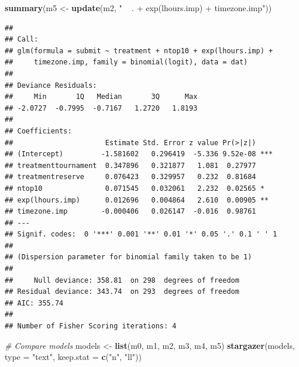 \documentclass[]{article}
\newenvironment{Shaded}{\begin{snugshade}}{\end{snugshade}}
\newcommand{\KeywordTok}[1]{\textcolor[rgb]{0.13,0.29,0.53}{\textbf{#1}}}
\newcommand{\DataTypeTok}[1]{\textcolor[rgb]{0.13,0.29,0.53}{#1}}
\newcommand{\StringTok}[1]{\textcolor[rgb]{0.31,0.60,0.02}{#1}}
\newcommand{\CommentTok}[1]{\textcolor[rgb]{0.56,0.35,0.01}{\textit{#1}}}
\newcommand{\NormalTok}[1]{#1}
\let\oldShaded\Shaded
\let\endoldShaded\endShaded
\renewenvironment{Shaded}{\footnotesize\oldShaded}{\endoldShaded}
\begin{document}
\begin{Shaded}
\begin{Highlighting}[]
\KeywordTok{summary}\NormalTok{(m5 <-}\StringTok{ }\KeywordTok{update}\NormalTok{(m2, }\StringTok{" ~ . + exp(lhours.imp) + timezone.imp"}\NormalTok{))}
\end{Highlighting}
\end{Shaded}

\begin{verbatim}
## 
## Call:
## glm(formula = submit ~ treatment + ntop10 + exp(lhours.imp) + 
##     timezone.imp, family = binomial(logit), data = dat)
## 
## Deviance Residuals: 
##     Min       1Q   Median       3Q      Max  
## -2.0727  -0.7995  -0.7167   1.2720   1.8193  
## 
## Coefficients:
##                      Estimate Std. Error z value Pr(>|z|)    
## (Intercept)         -1.581602   0.296419  -5.336 9.52e-08 ***
## treatmenttournament  0.347896   0.321877   1.081  0.27977    
## treatmentreserve     0.076423   0.329957   0.232  0.81684    
## ntop10               0.071545   0.032061   2.232  0.02565 *  
## exp(lhours.imp)      0.012696   0.004864   2.610  0.00905 ** 
## timezone.imp        -0.000406   0.026147  -0.016  0.98761    
## ---
## Signif. codes:  0 '***' 0.001 '**' 0.01 '*' 0.05 '.' 0.1 ' ' 1
## 
## (Dispersion parameter for binomial family taken to be 1)
## 
##     Null deviance: 358.81  on 298  degrees of freedom
## Residual deviance: 343.74  on 293  degrees of freedom
## AIC: 355.74
## 
## Number of Fisher Scoring iterations: 4
\end{verbatim}

\begin{Shaded}
\begin{Highlighting}[]
\CommentTok{# Compare models}
\NormalTok{models <-}\StringTok{ }\KeywordTok{list}\NormalTok{(m0, m1, m2, m3, m4, m5)}
\KeywordTok{stargazer}\NormalTok{(models, }\DataTypeTok{type =} \StringTok{"text"}\NormalTok{, }\DataTypeTok{keep.stat =} \KeywordTok{c}\NormalTok{(}\StringTok{"n"}\NormalTok{, }\StringTok{"ll"}\NormalTok{))}
\end{Highlighting}
\end{Shaded}
\end{document}
